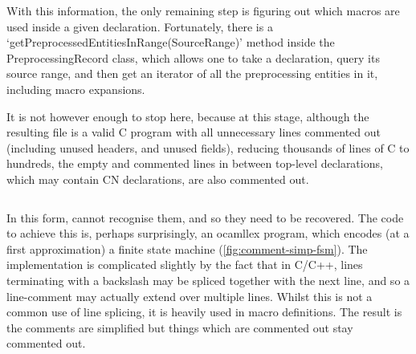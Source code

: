 \inputminted[breaklines,fontsize=\footnotesize,firstline=21]{cpp}{code/reachability_analyzer.hpp}

With this information, the only remaining step is figuring out which macros are
used inside a given declaration. Fortunately, there is a
`getPreprocessedEntitiesInRange(SourceRange)' method inside the %
PreprocessingRecord class, which allows one to take a declaration, query its
source range, and then get an iterator of all the preprocessing entities in it,
including macro expansions.

It is not however enough to stop here, because at this stage, although the
resulting file is a valid C program with all unnecessary lines commented out
(including unused headers, and unused fields), reducing thousands of lines of C
to hundreds, the empty and commented lines in between top-level declarations,
which may contain CN declarations, are also commented out.

\inputminted[breaklines,fontsize=\footnotesize]{cpp}{code/clang_tree_carve.cpp}

In this form,  cannot recognise them, and so they need to be recovered.
The code to achieve this is, perhaps surprisingly, an ocamllex program, which
encodes (at a first approximation) a finite state machine
(\cref{fig:comment-simp-fsm}). The implementation is complicated slightly by
the fact that in C/C++, lines terminating with a backslash may be spliced
together with the next line, and so a line-comment may actually extend over
multiple lines. Whilst this is not a common use of line splicing, it is heavily
used in macro definitions. The result is the comments are simplified but things
which are commented out stay commented out.

